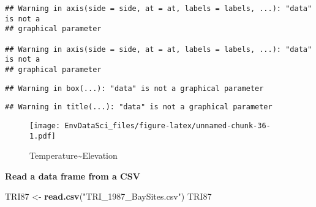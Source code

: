 \documentclass[
]{book}
\newenvironment{Shaded}{\begin{snugshade}}{\end{snugshade}}
\newcommand{\KeywordTok}[1]{\textcolor[rgb]{0.13,0.29,0.53}{\textbf{#1}}}
\newcommand{\NormalTok}[1]{#1}
\newcommand{\StringTok}[1]{\textcolor[rgb]{0.31,0.60,0.02}{#1}}
\begin{document}
\begin{verbatim}
## Warning in axis(side = side, at = at, labels = labels, ...): "data" is not a
## graphical parameter

## Warning in axis(side = side, at = at, labels = labels, ...): "data" is not a
## graphical parameter
\end{verbatim}

\begin{verbatim}
## Warning in box(...): "data" is not a graphical parameter
\end{verbatim}

\begin{verbatim}
## Warning in title(...): "data" is not a graphical parameter
\end{verbatim}

\begin{figure}
\centering
\texttt{[image: EnvDataSci\_files/figure-latex/unnamed-chunk-36-1.pdf]}
\caption{\label{fig:unnamed-chunk-36}Temperature\textasciitilde Elevation}
\end{figure}

\textbf{Read a data frame from a CSV}

\begin{Shaded}
\begin{Highlighting}[]
\NormalTok{TRI87 <-}\StringTok{ }\KeywordTok{read.csv}\NormalTok{(}\StringTok{"TRI_1987_BaySites.csv"}\NormalTok{)}
\NormalTok{TRI87}
\end{Highlighting}
\end{Shaded}
\end{document}
